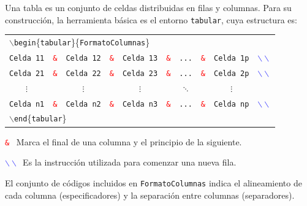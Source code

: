 \documentclass[10pt,a4paper]{article}
\begin{document}
Una tabla es un conjunto de celdas distribuidas en filas y columnas. Para su construcción, la herramienta básica es el entorno \texttt{tabular}, cuya estructura es:

\begin{center}
\begin{tabular}{cccccccccc}
\multicolumn{10}{l}{$\backslash$\texttt{begin}\{\texttt{tabular}\}\{\texttt{FormatoColumnas}\}} \\
\texttt{Celda 11} & \textcolor{red}{\texttt{\&}} &  \texttt{Celda 12} & \textcolor{red}{\texttt{\&}} & \texttt{Celda 13}  & \textcolor{red}{\texttt{\&}} & \texttt{...} & \textcolor{red}{\texttt{\&}} & \texttt{Celda 1p} &  \textcolor{blue}{\texttt{$\backslash\backslash$}} \\
\texttt{Celda 21} & \textcolor{red}{\texttt{\&}} &\texttt{Celda 22} & \textcolor{red}{\texttt{\&}} & \texttt{Celda 23} & \textcolor{red}{\texttt{\&}} & \texttt{...} & \textcolor{red}{\texttt{\&}} & \texttt{Celda 2p} &   \textcolor{blue}{\texttt{$\backslash\backslash$}} \\
\multicolumn{1}{c}{$\vdots$} &  &  \multicolumn{1}{c}{$\vdots$} &  & \multicolumn{1}{c}{$\vdots$} &  & \multicolumn{1}{c}{$\ddots$} &   & \multicolumn{1}{c}{$\vdots$}  &    \\
\texttt{Celda n1} & \textcolor{red}{\texttt{\&}} & \texttt{Celda n2} & \textcolor{red}{\texttt{\&}} & \texttt{Celda n3} & \textcolor{red}{\texttt{\&}} & \texttt{...} & \textcolor{red}{\texttt{\&}} & \texttt{Celda np} &   \textcolor{blue}{\texttt{$\backslash\backslash$}}  \\
\multicolumn{10}{l}{$\backslash$\texttt{end}\{\texttt{tabular}\}} \\
\end{tabular}
\end{center}



\bigskip 

\hangindent=1.3cm \textcolor{red}{\texttt{\&}}~ Marca el final de una columna y el principio de la siguiente. 

\medskip

\hangindent=1.3cm \textcolor{blue}{\texttt{$\backslash\backslash$}}~Es la instrucción utilizada para comenzar una nueva fila. 

\bigskip

\noindent El conjunto de códigos incluidos en \texttt{FormatoColumnas} indica el alineamiento de cada columna (especificadores) y la separación entre columnas (separadores).
\end{document}
